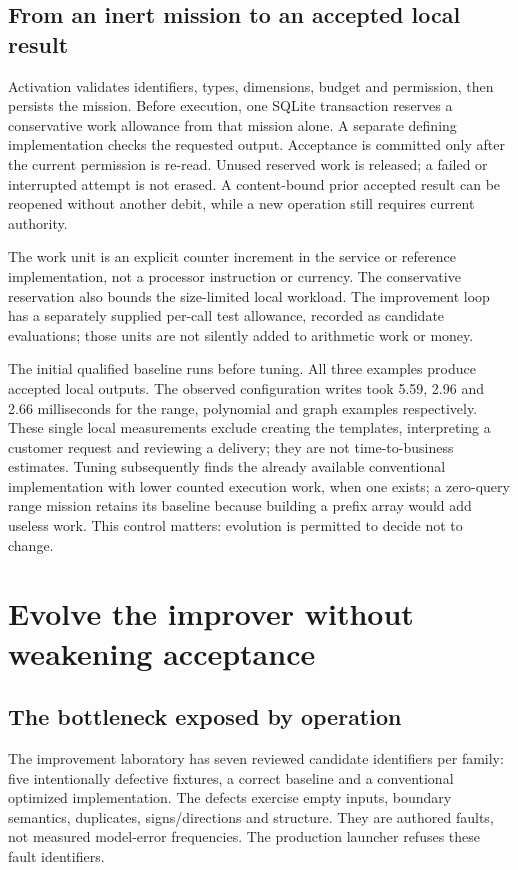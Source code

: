 \documentclass[11pt,letterpaper]{article}
\begin{document}
\subsection{From an inert mission to an accepted local result}
Activation validates identifiers, types, dimensions, budget and permission, then persists the mission. Before execution, one SQLite transaction reserves a conservative work allowance from that mission alone. A separate defining implementation checks the requested output. Acceptance is committed only after the current permission is re-read. Unused reserved work is released; a failed or interrupted attempt is not erased. A content-bound prior accepted result can be reopened without another debit, while a new operation still requires current authority.

The work unit is an explicit counter increment in the service or reference implementation, not a processor instruction or currency. The conservative reservation also bounds the size-limited local workload. The improvement loop has a separately supplied per-call test allowance, recorded as candidate evaluations; those units are not silently added to arithmetic work or money.

The initial qualified baseline runs before tuning. All three examples produce accepted local outputs. The observed configuration writes took 5.59, 2.96 and 2.66 milliseconds for the range, polynomial and graph examples respectively. These single local measurements exclude creating the templates, interpreting a customer request and reviewing a delivery; they are not time-to-business estimates. Tuning subsequently finds the already available conventional implementation with lower counted execution work, when one exists; a zero-query range mission retains its baseline because building a prefix array would add useless work. This control matters: evolution is permitted to decide not to change.

\section{Evolve the improver without weakening acceptance}
\subsection{The bottleneck exposed by operation}
The improvement laboratory has seven reviewed candidate identifiers per family: five intentionally defective fixtures, a correct baseline and a conventional optimized implementation. The defects exercise empty inputs, boundary semantics, duplicates, signs/directions and structure. They are authored faults, not measured model-error frequencies. The production launcher refuses these fault identifiers.
\end{document}
